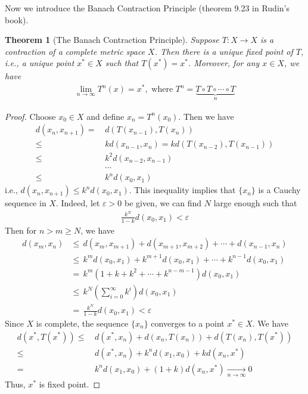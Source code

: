 \documentclass[12pt,leqno]{amsart}
\newtheorem{theorem}{Theorem}[section]
\theoremstyle{definition}
\numberwithin{equation}{subsection}
\begin{document}
Now we introduce the Banach Contraction Principle (theorem 9.23 in Rudin's book).
\begin{theorem}[The Banach Contraction Principle]
Suppose $T:X\to X$ is a contraction of a complete metric space $X$. Then there is a unique fixed point of $T$, i.e., a unique point $x^*\in X$ such that $T(x^*) = x^*$. Moreover, for any $x\in X$, we have 
\begin{align*}
    \lim_{n\to\infty} T^n(x) = x^*, \,\,\text{where}\,\, T^n = \underbrace{T \circ T \circ\cdots\circ T}_{n}
\end{align*}
\end{theorem}
\begin{proof}
Choose $x_0\in X$ and define $x_n = T^n(x_0)$. Then we have
\begin{align*}
    d(x_n,x_{n+1}) = \,& d\left(T(x_{n-1}),T(x_n)\right) \\
    \leq \,& k d\left(x_{n-1},x_n\right) = k d\left(T(x_{n-2}),T(x_{n-1})\right) \\
    \leq \,& k^2 d\left(x_{n-2},x_{n-1}\right) \\
    & \cdots \\
    \leq \,& k^n d\left(x_{0},x_{1}\right)
\end{align*}
i.e., $d(x_n,x_{n+1}) \leq k^n d\left(x_{0},x_{1}\right)$. This inequality implies that $\{x_n\}$ is a Cauchy sequence in $X$. Indeed, let $\varepsilon > 0$ be given, we can find $N$ large enough such that 
\begin{align*}
    \frac{k^N}{1 - k} d\left(x_{0},x_{1}\right) < \varepsilon
\end{align*}
Then for $n > m \geq N$, we have
\begin{align*}
    d(x_m,x_n) &\leq \, d(x_m,x_{m+1}) + d(x_{m+1},x_{m+2}) + \cdots + d(x_{n-1},x_{n})\\
    &\leq \, k^m d(x_{0},x_{1}) + k^{m+1} d(x_{0},x_{1}) + \cdots + k^{n-1}d(x_{0},x_{1})\\
    &= \, k^m(1 + k + k^2 + \cdots + k^{n-m-1})d(x_{0},x_{1})\\
    &\leq \, k^N \left(\sum^\infty_{i=0}k^i\right)d(x_{0},x_{1}) \\
    &= \, \frac{k^N}{1 - k} d\left(x_{0},x_{1}\right) < \varepsilon
\end{align*}
Since $X$ is complete, the sequence $\{x_n\}$ converges to a point $x^*\in X$. We have
\begin{align*}
    d\left(x^*,T(x^*)\right) \leq &\,  d\left(x^*,x_n\right) + d\left(x_n,T(x_n)\right) + d\left(T(x_n),T(x^*)\right) \\
    \leq &\, d\left(x^*,x_n\right) + k^n d\left(x_1,x_0\right) + k d\left(x_n,x^*\right)\\
    = &\, k^n d\left(x_1,x_0\right) + (1+k) d\left(x_n,x^*\right) \xrightarrow[n\to\infty]{} 0
\end{align*}
Thus, $x^*$ is fixed point.


\end{proof}
\end{document}
